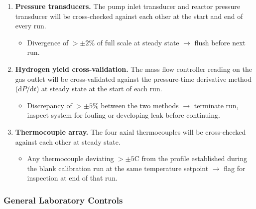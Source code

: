 \documentclass[12pt]{article}
\begin{document}
\begin{enumerate}[label=\textbf{\arabic*.}, leftmargin=*, itemsep=6pt]

    \item \textbf{Pressure transducers.}
    The pump inlet transducer and reactor pressure transducer will be cross-checked
    against each other at the start and end of every run.
    \begin{itemize}[itemsep=2pt]
        \item Divergence of $>{\pm}2\%$ of full scale at steady state $\rightarrow$
              flush before next run.
    \end{itemize}

    \item \textbf{Hydrogen yield cross-validation.}
    The mass flow controller reading on the gas outlet will be cross-validated
    against the pressure-time derivative method ($\mathrm{d}P/\mathrm{d}t$) at
    steady state at the start of each run.
    \begin{itemize}[itemsep=2pt]
        \item Discrepancy of $>{\pm}5\%$ between the two methods $\rightarrow$
              terminate run, inspect system for fouling or developing leak before
              continuing.
    \end{itemize}

    \item \textbf{Thermocouple array.}
    The four axial thermocouples will be cross-checked against each other at steady
    state.
    \begin{itemize}[itemsep=2pt]
        \item Any thermocouple deviating $>{\pm}5$\textdegree C from the profile
              established during the blank calibration run at the same temperature
              setpoint $\rightarrow$ flag for inspection at end of that run.
    \end{itemize}

\end{enumerate}

\subsubsection{General Laboratory Controls}
\end{document}
